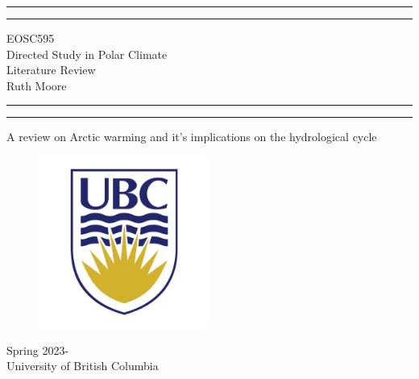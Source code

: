 \documentclass[12pt, oneside]{article}
\begin{document}





\begin{titlepage}
    \centering 
	\scshape
	\vspace*{2\baselineskip}
	\rule{\textwidth}{1.6pt}\vspace*{-\baselineskip}\vspace*{2pt} 
	\rule{\textwidth}{0.4pt} 
	\vspace{0.75\baselineskip} 
	{\Huge EOSC595 \\ Directed Study in Polar Climate} \\
	\vspace{0.1in}
		{\Large Literature Review} \\
		\vspace{0.1in}
		{\Large Ruth Moore} \\
	\vspace{0.75\baselineskip} 
	\rule{\textwidth}{0.4pt}\vspace*{-\baselineskip}\vspace*{2pt} 
		\rule{\textwidth}{1.6pt}
	\vspace*{2\baselineskip} 

\Huge{A review on Arctic warming and it's implications on the hydrological cycle}
\vspace{0.1in}	

\begin{figure}[hbtp]
\centering
\includegraphics[width=0.5\textwidth]{../ubc-logo-png-transparent.png}
\end{figure}
{\Large Spring 2023- } \\
	{\large University of British Columbia} 
\end{titlepage}
\pagestyle{fancy}


{
  \hypersetup{linkcolor=black}
  \tableofcontents
}
\end{document}
